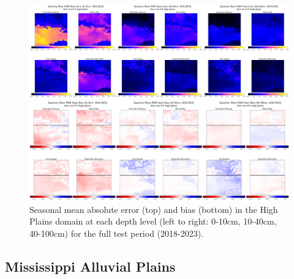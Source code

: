\begin{figure}[H]
    \centering

    \includegraphics[width=.98\linewidth,draft=false]{figures/lt-high-plains/eval-grid_lt-high-plains_lstm-rsm-9_pixelwise-time-stats_abs-err_qtrly-err-state-all-3.png}

    \includegraphics[width=.98\linewidth,draft=false]{figures/lt-high-plains/eval-grid_lt-high-plains_lstm-rsm-9_pixelwise-time-stats_bias_qtrly-err-state-all-3.png}

    \caption{Seasonal mean absolute error (top) and bias (bottom) in the High Plains domain at each depth level (left to right: 0-10cm, 10-40cm, 40-100cm) for the full test period (2018-2023).}
    \label{lt_mae-bias_high-plains}
\end{figure}


\newpage

\subsection{Mississippi Alluvial Plains}

